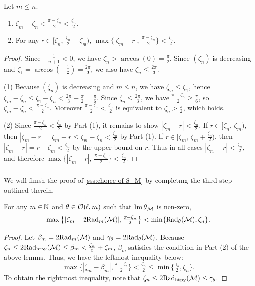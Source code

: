 \lemma
Let $m \leq n$.
\begin{enumerate}
	\item $\zeta_m - \zeta_n < \tfrac{\pi - \zeta_n}{2} < \tfrac{\zeta_n}{2}$.
	\item For any $r \in \big[\zeta_n,\, \tfrac{\zeta_n}{2}+\zeta_m\big)$, $\max\big\{|\zeta_m - r|,\, \tfrac{\pi - \zeta_n}{2}\big\} < \tfrac{\zeta_n}{2}$.
\end{enumerate}

\begin{proof}
	Since $-\frac{1}{n+1} < 0$, we have $\zeta_n > \arccos(0) = \tfrac{\pi}{2}$.
	Since $(\zeta_n)$ is decreasing and $\zeta_1 = \arccos\!\left(-\tfrac12\right) = \tfrac{2\pi}{3}$, we also have $\zeta_n \le \tfrac{2\pi}{3}$.

	\smallskip
	(1) Because $(\zeta_n)$ is decreasing and $m\le n$, we have $\zeta_m \le \zeta_1$, hence
	$\zeta_m - \zeta_n \le \zeta_1 - \zeta_n < \tfrac{2\pi}{3} - \tfrac{\pi}{2} = \tfrac{\pi}{6}$.
	Since $\zeta_n \le \tfrac{2\pi}{3}$, we have $\tfrac{\pi - \zeta_n}{2} \ge \tfrac{\pi}{6}$, so $\zeta_m - \zeta_n < \tfrac{\pi - \zeta_n}{2}$.
	Moreover $\tfrac{\pi - \zeta_n}{2} < \tfrac{\zeta_n}{2}$ is equivalent to $\zeta_n > \tfrac{\pi}{2}$, which holds.

	\smallskip
	(2) Since $\tfrac{\pi - \zeta_n}{2} < \tfrac{\zeta_n}{2}$ by Part (1), it remains to show $|\zeta_m - r| < \tfrac{\zeta_n}{2}$.
	If $r \in [\zeta_n,\, \zeta_m)$, then $|\zeta_m - r| = \zeta_m - r \le \zeta_m - \zeta_n < \tfrac{\zeta_n}{2}$ by Part (1).
	If $r \in [\zeta_m,\, \zeta_m + \tfrac{\zeta_n}{2})$, then $|\zeta_m - r| = r - \zeta_m < \tfrac{\zeta_n}{2}$ by the upper bound on $r$.
	Thus in all cases $|\zeta_m - r| < \tfrac{\zeta_n}{2}$, and therefore $\max\big\{|\zeta_m - r|,\, \tfrac{\pi - \zeta_n}{2}\big\} < \tfrac{\zeta_n}{2}$.
\end{proof}

\subsubsection{}\label{sss:comparison_lemma_zeta_n}

We will finish the proof of \cref{sss:choice of S_M} by completing the third step outlined therein.

\lemma
For any $m \in \mathbb{N}$ and $\theta \in \mathcal{O}(\ell, m)$ such that $\operatorname{Im} \theta_{\mathcal{M}}$ is non-zero,
\[\max\big\{|\zeta_m - 2\mathrm{Rad}_{m}(\mathcal{M}) |, \tfrac{\pi - \zeta_n}{2}\big\} < \min\{\mathrm{Rad}_{\theta}(\mathcal{M}), \zeta_n\}.\]
\begin{proof}
	Let $\beta_m = 2\mathrm{Rad}_{m}(\mathcal{M})$ and $\gamma_\theta = 2\mathrm{Rad}_{\theta}(\mathcal{M})$.
	Because \(\zeta_n \leq 2\mathrm{Rad}_{\mathrm{htpy}}(\mathcal{M}) \leq \beta_m < \tfrac{\zeta_n}{2} + \zeta_m\), $\beta_m$ satisfies the condition in Part (2) of the above lemma.
	Thus, we have the leftmost inequality below:
	\[
	\max\big\{|\zeta_m - \beta_m|, \tfrac{\pi - \zeta_n}{2}\big\} < \tfrac{\zeta_n}{2}
	\leq
	\min\big\{\tfrac{\gamma_\theta}{2}, \zeta_n\big\}.
	\]
	To obtain the rightmost inequality, note that \(\zeta_n \leq 2\mathrm{Rad}_{\mathrm{htpy}}(\mathcal{M}) \leq \gamma_\theta\).
\end{proof}


